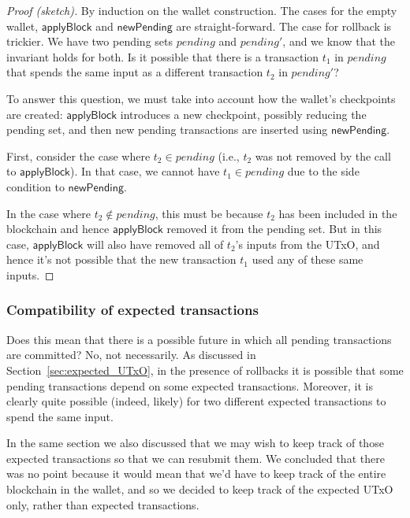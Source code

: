 \documentclass{article}
\begin{document}
\begin{proof}[Proof (sketch)]
By induction on the wallet construction. The cases for the empty wallet,
$\mathsf{applyBlock}$ and $\mathsf{newPending}$ are straight-forward.
The case for rollback is trickier. We have two pending sets
$\mathit{pending}$ and $\mathit{pending'}$, and we know that the invariant
holds for both. Is it possible that there is a transaction $t_1$ in $\mathit{pending}$
that spends the same input as a different transaction $t_2$ in $\mathit{pending}'$?

To answer this question, we must take into account how the wallet's checkpoints
are created: $\mathsf{applyBlock}$ introduces a new checkpoint, possibly
reducing the pending set, and then new pending transactions are inserted using
$\mathsf{newPending}$.

First, consider the case where $t_2 \in \mathit{pending}$ (i.e., $t_2$ was not
removed by the call to $\mathsf{applyBlock}$). In that case, we cannot have $t_1
\in \mathit{pending}$ due to the side condition to $\mathsf{newPending}$.

In the case where $t_2 \notin \mathit{pending}$, this must be because $t_2$
has been included in the blockchain and hence $\mathsf{applyBlock}$ removed
it from the pending set. But in this case, $\mathsf{applyBlock}$ will also
have removed all of $t_2$'s inputs from the UTxO, and hence it's not possible
that the new transaction $t_1$ used any of these same inputs.
\end{proof}


\subsubsection{Compatibility of expected transactions}
\label{sec:compat_of_expected_trans}

Does this mean that there is a possible future in which all pending transactions
are committed? No, not necessarily. As discussed in
Section~\ref{sec:expected_UTxO}, in the presence of rollbacks it is possible
that some pending transactions depend on some expected transactions. Moreover,
it is clearly quite possible (indeed, likely) for two different expected
transactions to spend the same input.

In the same section we also discussed that we may wish to keep track of those
expected transactions so that we can resubmit them. We concluded that there
was no point because it would mean that we'd have to keep track of the
entire blockchain in the wallet, and so we decided to keep track of the
expected UTxO only, rather than expected transactions.
\end{document}
